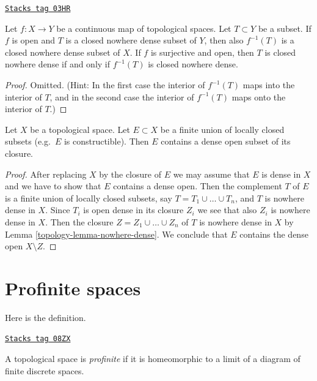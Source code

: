 \begin{lemma}
\label{topology-lemma-open-inverse-image-closed-nowhere-dense}
\href{https://stacks.math.columbia.edu/tag/03HR}{\texttt{Stacks tag 03HR}}

Let $f : X \to Y$ be a continuous map of topological spaces.
Let $T \subset Y$ be a subset.
If $f$ is open and $T$ is a closed nowhere dense subset of $Y$,
then also $f^{-1}(T)$ is a closed nowhere dense subset of $X$.
If $f$ is surjective and open, then
$T$ is closed nowhere dense if and only
if $f^{-1}(T)$ is closed nowhere dense.
\end{lemma}

\begin{proof}
Omitted. (Hint: In the first case the interior of $f^{-1}(T)$
maps into the interior of $T$, and in the second case the interior of
$f^{-1}(T)$ maps onto the interior of $T$.)
\end{proof}

\begin{lemma}
\label{topology-lemma-dense-in-constructible}

Let $X$ be a topological space. Let $E \subset X$ be a finite union
of locally closed subsets (e.g.\ $E$ is constructible). Then $E$
contains a dense open subset of its closure.
\end{lemma}

\begin{proof}

After replacing $X$ by the closure of $E$ we may assume that $E$
is dense in $X$ and we have to show that $E$ contains a dense open.
Then the complement $T$ of $E$ is a finite union of locally closed subsets,
say $T = T_1 \cup \ldots \cup T_n$, and $T$ is nowhere dense in $X$.
Since $T_i$ is open dense in its closure $Z_i$ we see that also
$Z_i$ is nowhere dense in $X$. Then the closure $Z = Z_1 \cup \ldots \cup Z_n$
of $T$ is nowhere dense in $X$ by Lemma \ref{topology-lemma-nowhere-dense}.
We conclude that $E$ contains the dense open $X \setminus Z$.
\end{proof}

\section{Profinite spaces}
\label{topology-section-profinite}
Here is the definition.

\begin{definition}[Profinite]
\label{topology-definition-profinite}
\href{https://stacks.math.columbia.edu/tag/08ZX}{\texttt{Stacks tag 08ZX}}

A topological space is {\it profinite} if it is homeomorphic to a limit
of a diagram of finite discrete spaces.
\end{definition}

